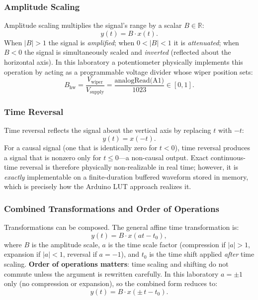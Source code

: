 \documentclass[11pt,letterpaper]{article}
\begin{document}
\subsubsection{Amplitude Scaling}
Amplitude scaling multiplies the signal's range by a scalar $B \in \mathbb{R}$:
\begin{equation}
    y(t) = B \cdot x(t).
\end{equation}
When $|B| > 1$ the signal is \emph{amplified}; when $0 < |B| < 1$ it is \emph{attenuated}; when $B < 0$ the signal is simultaneously scaled and \emph{inverted} (reflected about the horizontal axis). In this laboratory a potentiometer physically implements this operation by acting as a programmable voltage divider whose wiper position sets:
\begin{equation}
    B_{\text{hw}} = \frac{V_{\text{wiper}}}{V_{\text{supply}}} = \frac{\text{analogRead(A1)}}{1023} \in [0, 1].
\end{equation}

\subsubsection{Time Reversal}
Time reversal reflects the signal about the vertical axis by replacing $t$ with $-t$:
\begin{equation}
    y(t) = x(-t).
\end{equation}
For a causal signal (one that is identically zero for $t < 0$), time reversal produces a signal that is nonzero only for $t \leq 0$---a non-causal output. Exact continuous-time reversal is therefore physically non-realizable in real time; however, it is \emph{exactly} implementable on a finite-duration buffered waveform stored in memory, which is precisely how the Arduino LUT approach realizes it.

\subsubsection{Combined Transformations and Order of Operations}
Transformations can be composed. The general affine time transformation is:
\begin{equation}
    y(t) = B \cdot x(at - t_0),
    \label{eq:combined}
\end{equation}
where $B$ is the amplitude scale, $a$ is the time scale factor (compression if $|a|>1$, expansion if $|a|<1$, reversal if $a = -1$), and $t_0$ is the time shift applied \emph{after} time scaling. \textbf{Order of operations matters}: time scaling and shifting do not commute unless the argument is rewritten carefully. In this laboratory $a = \pm 1$ only (no compression or expansion), so the combined form reduces to:
\begin{equation}
    y(t) = B \cdot x(\pm\, t - t_0).
\end{equation}
\end{document}
